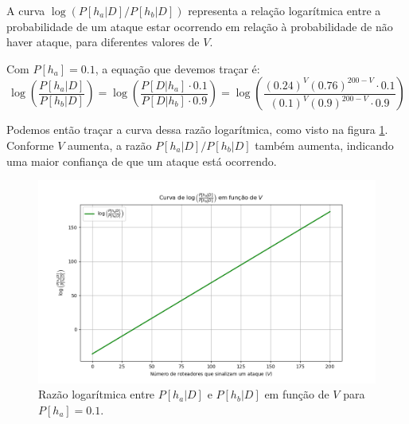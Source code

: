 \documentclass[12 pt]{article}
\begin{document}
\begin{enumerate}
    \begin{tcolorbox}[colback=white, colframe=black, title=Resposta:]

    A curva \( \log(P[h_a|D]/P[h_b|D]) \) representa a relação logarítmica entre a probabilidade de um ataque estar ocorrendo em relação à probabilidade de não haver ataque, para diferentes valores de \( V \).
    
    Com \( P[h_a] = 0.1 \), a equação que devemos traçar é:
    $$
    \log\left( \frac{P[h_a|D]}{P[h_b|D]} \right) = \log\left( \frac{P[D|h_a] \cdot 0.1}{P[D|h_b] \cdot 0.9} \right) = \log\left( \frac{(0.24)^V (0.76)^{200 - V} \cdot 0.1}{(0.1)^V (0.9)^{200 - V} \cdot 0.9} \right)
    $$
    
    Podemos então traçar a curva dessa razão logarítmica, como visto na figura \ref{fig:log_probabilidades}. Conforme \( V \) aumenta, a razão \( P[h_a|D]/P[h_b|D] \) também aumenta, indicando uma maior confiança de que um ataque está ocorrendo.
    
\end{tcolorbox}

\begin{figure}[H]
    \centering
    \includegraphics[width=\textwidth]{fig/item_8.png}
    \caption{Razão logarítmica entre \( P[h_a|D] \) e \( P[h_b|D] \) em função de \( V \) para \( P[h_a] = 0.1 \).}
    \label{fig:log_probabilidades}
\end{figure}


\end{enumerate}
\end{document}
